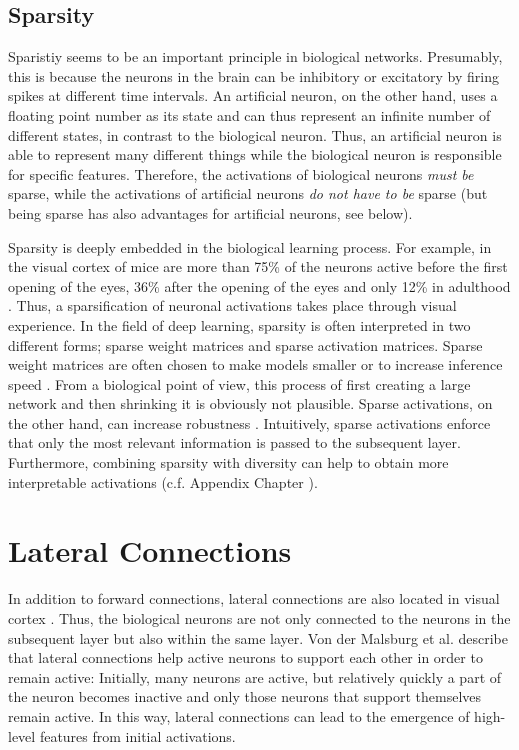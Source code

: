 \subsection{Sparsity}
Sparistiy seems to be an important principle in biological networks.
Presumably, this is because the neurons in the brain can be inhibitory or excitatory by firing spikes at different time intervals. An artificial neuron, on the other hand, uses a floating point number as its state and can thus represent an infinite number of different states, in contrast to the biological neuron.
Thus, an artificial neuron is able to represent many different things while the biological neuron is responsible for specific features.
Therefore, the activations of biological neurons \emph{must be} sparse, while the activations of artificial neurons \emph{do not have to be} sparse (but being sparse has also advantages for artificial neurons, see below).

Sparsity is deeply embedded in the biological learning process.
For example, in the visual cortex of mice are more than 75\% of the neurons active before the first opening of the eyes, 36\% after the opening of the eyes and only 12\% in adulthood .
Thus, a sparsification of neuronal activations takes place through visual experience.
In the field of deep learning, sparsity is often interpreted in two different forms; sparse weight matrices and sparse activation matrices.
Sparse weight matrices are often chosen to make models smaller or to increase inference speed .
From a biological point of view, this process of first creating a large network and then shrinking it is obviously not plausible.
Sparse activations, on the other hand, can increase robustness \cite{Panousis_Chatzis_Theodoridis_2021}.
Intuitively, sparse activations enforce that only the most relevant information is passed to the subsequent layer.
Furthermore, combining sparsity with diversity can help to obtain more interpretable activations (c.f. Appendix Chapter ).

\section{Lateral Connections}
In addition to forward connections, lateral connections are also located in visual cortex .
Thus, the biological neurons are not only connected to the neurons in the subsequent layer but also within the same layer.
Von der Malsburg et al. \cite{von_der_Malsburg_Stadelmann_Grewe_2022} describe that lateral connections help active neurons to support each other in order to remain active:
Initially, many neurons are active, but relatively quickly a part of the neuron becomes inactive and only those neurons that support themselves remain active. In this way, lateral connections can lead to the emergence of high-level features from initial activations.

